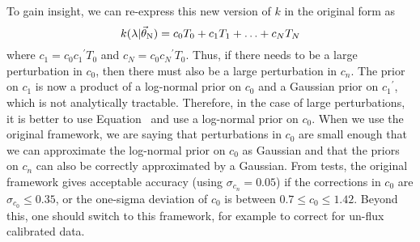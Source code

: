 \documentclass[preprint]{aastex} %
\newcommand{\vt}{\vec{\theta}}
\newcommand{\vN}{\vt_{\rm N}}
\begin{document}
To gain insight, we can re-express this new version of $k$ in the original form as 
\begin{equation}
   k(\lambda | \vN) = c_0 T_0 + c_1 T_1 + \ldots + c_N T_N
\end{equation}
where $c_1 = c_0 {c_1}^\prime T_0$ and $c_N = c_0 {c_N}^\prime T_0$. Thus, if there needs to be a large perturbation in $c_0$, then there must also be a large perturbation in $c_n$. The prior on $c_1$ is now a product of a log-normal prior on $c_0$ and a Gaussian prior on ${c_1}^\prime$, which is not analytically tractable. Therefore, in the case of large perturbations, it is better to use Equation~ and use a log-normal prior on $c_0$. When we use the original framework, we are saying that perturbations in $c_0$ are small enough that we can approximate the log-normal prior on $c_0$ as Gaussian and that the priors on $c_n$ can also be correctly approximated by a Gaussian. From tests, the original framework gives acceptable accuracy (using $\sigma_{c_n} = 0.05$) if the corrections in $c_0$ are $\sigma_{c_0} \leq 0.35$, or the one-sigma deviation of $c_0$ is between $0.7 \leq c_0 \leq 1.42$. Beyond this, one should switch to this framework, for example to correct for un-flux calibrated data.




\end{document}
